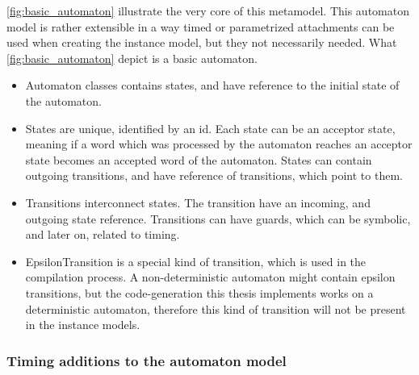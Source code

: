 \cref{fig:basic_automaton} illustrate the very core of this metamodel. This automaton model is rather extensible in a way timed or parametrized attachments can be used when creating the instance model, but they not necessarily needed. What \cref{fig:basic_automaton} depict is a basic automaton.
\begin{itemize}
	\item Automaton classes contains states, and have reference to the initial state of the automaton.
	\item States are unique, identified by an id. Each state can be an acceptor state, meaning if a word which was processed by the automaton reaches an acceptor state becomes an accepted word of the automaton. States can contain outgoing transitions, and have reference of transitions, which point to them.
	\item Transitions interconnect states. The transition have an incoming, and outgoing state reference. Transitions can have guards, which can be symbolic, and later on, related to timing.
	\item EpsilonTransition is a special kind of transition, which is used in the compilation process. A non-deterministic automaton might contain epsilon transitions, but the code-generation this thesis implements works on a deterministic automaton, therefore this kind of transition will not be present in the instance models.
\end{itemize}

\subsubsection{Timing additions to the automaton model}

